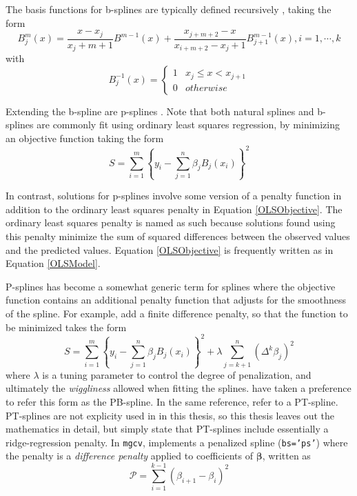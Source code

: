 \documentclass[phdcss]{SDSUThesis}
\begin{document}
The basis functions for b-splines are typically defined recursively \cite{wood-2017, perperoglou-2019}, taking the form \cite{wood-2017}
\begin{equation}
   B_j^m(x) = \frac{x-x_j}{x_j+m+1}B^{m-1}(x) + \frac{x_{j+m+2}-x}{x_{i+m+2}-x_j+1}B^{m-1}_{j+1}(x), i = 1, \cdots, k
\end{equation}
with
\begin{equation}
   B^{-1}_j(x) = 
   \begin{cases} 
      1 & x_j \leq x < x_{j+1} \\
      0 & otherwise
   \end{cases}
\end{equation}

Extending the b-spline are p-splines \cite{eilers-1996}. Note that both natural splines and b-splines are commonly fit using ordinary least squares regression, by minimizing an objective function taking the form
\begin{equation}\label{OLSObjective}
S = \sum_{i=1}^m \left\{  y_i - \sum_{j=1}^n \beta_j B_j(x_i) \right\}^2
\end{equation}

In contrast, solutions for p-splines involve some version of a penalty function in addition to the ordinary least squares penalty in Equation \ref{OLSObjective}. The ordinary least squares penalty is named as such because solutions found using this penalty minimize the sum of squared differences between the observed values and the predicted values. Equation \ref{OLSObjective} is frequently written as in Equation \ref{OLSModel}.

P-splines has become a somewhat generic term for splines \cite{eilers-09-2010} where the objective function contains an additional penalty function that adjusts for the smoothness of the spline. For example, \cite{eilers-1996} add a finite difference penalty, so that the function to be minimized takes the form
\begin{equation}\label{PBsplines}
S = \sum_{i=1}^m \left\{  y_i - \sum_{j=1}^n \beta_j B_j(x_i) \right\}^2 + \lambda \sum_{j=k+1}^n (\Delta^k \beta_j)^2
\end{equation}
where $\lambda$ is a tuning parameter to control the degree of penalization, and ultimately the \textit{wiggliness} allowed when fitting the splines. \cite{eilers-09-2010} have taken a preference to refer this form as the PB-spline. In the same reference, \cite{eilers-09-2010} refer to a PT-spline. PT-splines are not explicity used in in this thesis, so this thesis leaves out the mathematics in detail, but simply state that PT-splines include essentially a ridge-regression penalty. In \texttt{mgcv}, \cite{wood-2017} implements a penalized spline (\texttt{bs='ps'}) where the penalty is a \textit{difference penalty} applied to coefficients of $\mathbf{\beta}$, written as
\begin{equation}\label{WoodPS}
\mathcal{P} = \sum_{i=1}^{k-1} \left( \beta_{i+1} - \beta_{i} \right)^2
\end{equation}
\end{document}
